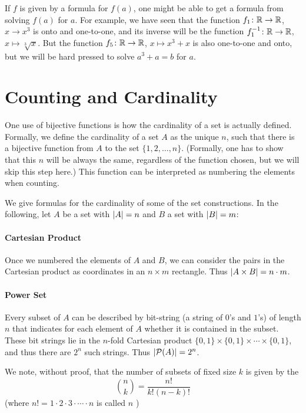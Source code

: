 If $f$ is given by a formula for $f(a)$, one might be able to get a formula  from
solving $f(a)$ for $a$. For example, we have seen that the function $f_1\colon{\mathbb R}\to{\mathbb R}$,
$x\to x^3$ is onto and one-to-one, and its inverse will be the function
$f_1^{-1}\colon{\mathbb R}\to{\mathbb R}$, $x\mapsto\sqrt[3]{x}$. But the function $f_5\colon{\mathbb R}\to{\mathbb R}$,
$x\mapsto x^3+x$ is also one-to-one and  onto, but we will be hard pressed to solve
$a^3+a=b$ for $a$.

\section{Counting and Cardinality}
\label{defcardinality}

One use of bijective functions is how the cardinality of a set is actually defined.
Formally, we
define the cardinality of a set $A$ as the unique $n$, such that there is a bijective
function from $A$ to the set $\{1,2,\ldots,n\}$. (Formally, one has to show that this
$n$ will be always the same, regardless of the function chosen, but we will skip this
step here.) This function can be interpreted as numbering the elements when counting.

We give formulas for the cardinality of some of the set constructions. In the following,
let $A$ be a set with $\left|A\right|=n$ and $B$ a set with $\left|B\right|=m$:

\paragraph{Cartesian Product}
Once we numbered the elements of $A$ and $B$, we can consider the pairs in the Cartesian
product as coordinates in an $n\times m$ rectangle. Thus $\left|A\times B\right|=n\cdot m$.

\paragraph{Power Set}
Every subset of $A$ can be described by bit-string (a string of $0$'s and
$1$'s) of length $n$ that indicates for each
element of $A$ whether it is contained in the subset. These bit strings lie in the
$n$-fold Cartesian product $\{0,1\}\times\{0,1\}\times\cdots\times\{0,1\}$, and thus
there are $2^n$ such strings. Thus $\left|{\mathcal P}(A)\right|=2^n$.

We note, without proof, that the number of subsets of fixed size $k$ is given by the
\[
{n\choose k}=\frac{n!}{k!(n-k)!}
\]
(where $n!=1\cdot 2\cdot 3\cdot\cdots\cdot n$ is called $n$ )

